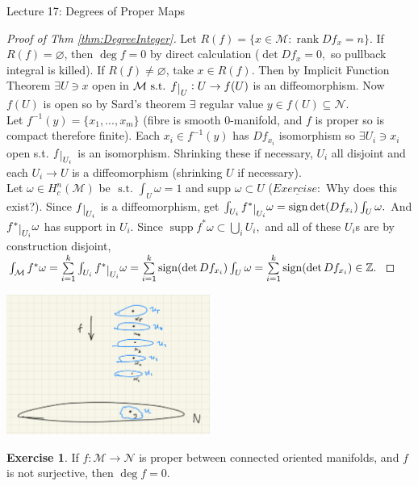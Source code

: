 \documentclass[10pt]{article}
\theoremstyle{plain}
\theoremstyle{definition}
\newtheorem{exercise}[thm]{Exercise}
\newcommand{\st}{\text{ s.t. }}
\newcommand{\man}{\mathcal{M}}
\newcommand{\nan}{\mathcal{N}}
\newcommand{\xman}{x\in\man}
\newcommand{\allthe}[3]{{#1}_{#2},...,{#1}_{#3}}
\newcommand{\sumfromto}[2]{\sum\limits_{#1}^{#2}}
\def\restrict#1{\raise-.5ex\hbox{\ensuremath|}_{#1}}
\newcommand{\compactcohomman}[1]{H_c^{#1}(\man)}
\DeclareMathOperator{\rank}{rank}
\DeclareMathOperator{\sign}{sign}
\DeclareMathOperator{\supp}{supp }
\begin{document}
\begin{section}{Lecture 17: Degrees of Proper Maps}
\begin{proof}[Proof of Thm \ref{thm:DegreeInteger}]
Let $R(f) = \{\xman : \rank Df_x = n\}$. If $R(f) = \varnothing$, then $\deg f = 0$ by direct calculation ($\det Df_x = 0,$ so pullback integral is killed). If $R(f) \neq\varnothing$, take $x \in R(f).$ Then by Implicit Function Theorem $\exists U \ni x$ open in $\man \st f\restrict{U} : U \to f(U)$ is an diffeomorphism. Now $f(U)$ is open so by Sard's theorem $\exists$ regular value $y\in f(U) \subseteq \nan$.\\
Let $f^{-1}(y) = \{\allthe{x}{1}{m} \}$ (fibre is smooth 0-manifold, and $f$ is proper so is compact therefore finite). Each $x_i \in f^{-1}(y)$ has $Df_{x_i}$ isomorphism so $\exists U_i \ni x_i$ open s.t. $f\restrict{U_i}$ is an isomorphism. Shrinking these if necessary, $U_i$ all disjoint and each $U_i \to U$ is a diffeomorphism (shrinking $U$ if necessary).\\
Let $\omega \in \compactcohomman{n}$ be $\st \int_U \omega = 1$ and supp $\omega \subset U$ ($\underline{Exercise:}$ Why does this exist?). Since $f\restrict{U_i}$ is a diffeomorphism, get $\int_{U_i} f^* \restrict{U_i} \omega = \sign \det(Df_{x_i}) \int_U \omega.$ And $f^*\restrict{U_i} \omega$ has support in $U_i$. Since $\supp f^*\omega \subset \bigcup\limits_{i} U_i,$ and all of these $U_i$s are by construction disjoint, $\int_\man f^*\omega = \sumfromto{i=1}{k} \int_{U_i} f^*\restrict{U_i} \omega = \sumfromto{i=1}{k} \sign(\det Df_{x_i}) \int_U \omega = \sumfromto{i=1}{k} \sign (\det Df_{x_i}) \in \mathbb{Z}.$
\end{proof}
\begin{center}
    \includegraphics[width = 0.5\textwidth]{DegreeCovering.png}
\end{center}

\begin{exercise}
If $f : \man \to \nan$ is proper between connected oriented manifolds, and $f$ is not surjective, then $\deg f = 0.$
\end{exercise}


\end{section}
\end{document}

